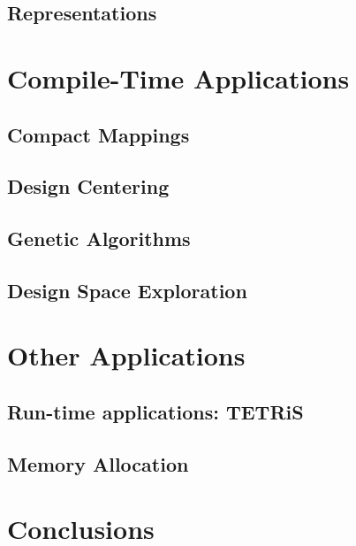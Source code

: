 \documentclass{report}
\begin{document}
\section{Representations}
%

\chapter{Compile-Time Applications}

\section{Compact Mappings}
\section{Design Centering}
\section{Genetic Algorithms}
\section{Design Space Exploration}

\chapter{Other Applications}

\section{Run-time applications: TETRiS}
\section{Memory Allocation}

\chapter{Conclusions}

\end{document}
